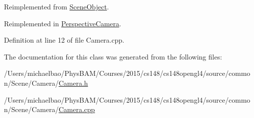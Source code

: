 Reimplemented from \hyperlink{class_scene_object_a20e31da3f9d2765de50cdb2d637ae6c9}{Scene\+Object}.



Reimplemented in \hyperlink{class_perspective_camera_a2f17fb07425e2146d5692805753fa368}{Perspective\+Camera}.



Definition at line 12 of file Camera.\+cpp.



The documentation for this class was generated from the following files\+:\begin{DoxyCompactItemize}
\item 
/\+Users/michaelbao/\+Phys\+B\+A\+M/\+Courses/2015/cs148/cs148opengl4/source/common/\+Scene/\+Camera/\hyperlink{_camera_8h}{Camera.\+h}\item 
/\+Users/michaelbao/\+Phys\+B\+A\+M/\+Courses/2015/cs148/cs148opengl4/source/common/\+Scene/\+Camera/\hyperlink{_camera_8cpp}{Camera.\+cpp}\end{DoxyCompactItemize}
